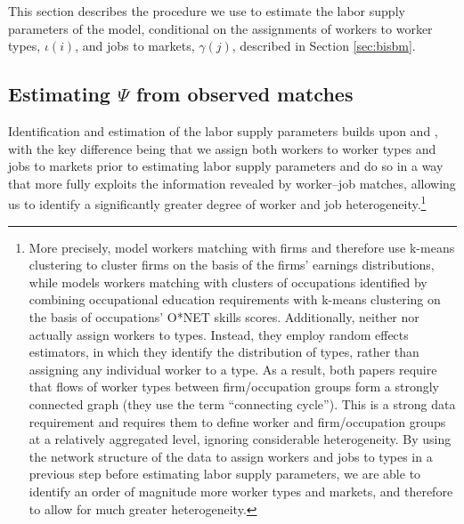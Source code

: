 \documentclass[12pt]{article}
\def\g{\gamma}
\def\i{\iota}
\theoremstyle{definition}
\theoremstyle{plain}
\begin{document}
This section describes the procedure we use to estimate the labor supply parameters of the model, conditional on the assignments of workers to worker types, $\i(i)$, and jobs to markets, $\g(j)$, described in Section \ref{sec:bisbm}.


\subsection{Estimating $\Psi$ from observed matches}

\label{sec:estimating_psi}


Identification and estimation of the labor supply parameters builds upon  \citet{BonhommeLamadonManresa2019_distributional} and \citet{Grigsby2019}, with the key difference being that we assign both workers to worker types and jobs to markets prior to estimating labor supply parameters and do so in a way that more fully exploits the information revealed by worker--job matches, allowing us to identify a significantly greater degree of worker and job heterogeneity.\footnote{More precisely, \citet{BonhommeLamadonManresa2019_distributional} model workers matching with firms and therefore use k-means clustering to cluster firms on the basis of the firms' earnings distributions, while \citet{Grigsby2019} models workers matching with clusters of occupations identified by combining occupational education requirements with k-means clustering on the basis of occupations' O*NET skills scores. Additionally, neither \citet{BonhommeLamadonManresa2019_distributional} nor \citet{Grigsby2019} actually assign workers to types. Instead,  they employ random effects estimators, in which they identify the distribution of types, rather than assigning any individual worker to a type. As a result, both papers require that flows of worker types between firm/occupation groups form a strongly connected graph (they use the term ``connecting cycle''). This is a strong data requirement and requires them to define worker and firm/occupation groups at a relatively aggregated level, ignoring considerable heterogeneity. By using the network structure of the data to assign workers and jobs to types in a previous step before estimating labor supply parameters, we are able to identify an order of magnitude more worker types and markets, and therefore to allow for much greater heterogeneity.} 
\end{document}

